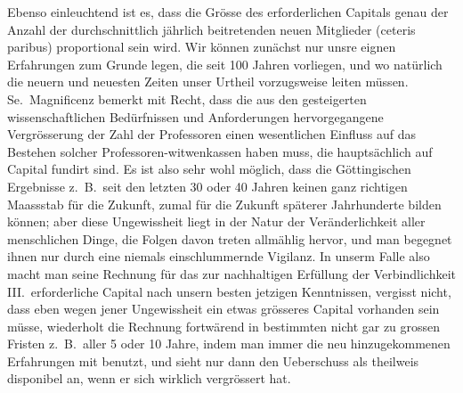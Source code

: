 \documentclass[12pt,a4paper]{article}
\begin{document}
Ebenso einleuchtend ist es, dass die Gr\"osse des erforderlichen Capitals genau der Anzahl der durchschnittlich j\"ahrlich beitretenden neuen Mitglieder (ceteris paribus) proportional sein wird. Wir k\"onnen zun\"achst nur unsre eignen Erfahrungen zum Grunde legen, die seit 100 Jahren vorliegen, und wo nat\"urlich die neuern und neuesten Zeiten unser Urtheil vorzugsweise leiten m\"ussen. Se.\ Magnificenz bemerkt mit Recht, dass die aus den gesteigerten wissenschaftlichen Bed\"urfnissen und Anforderungen hervorgegangene Vergr\"osserung der Zahl der Professoren einen wesentlichen Einfluss auf das Bestehen solcher Professoren-witwenkassen haben muss, die haupts\"achlich auf Capital fundirt sind. Es ist also sehr wohl m\"oglich, dass die G\"ottingischen Ergebnisse z.\ B.\ seit den letzten 30 oder 40 Jahren keinen ganz richtigen Maassstab f\"ur die Zukunft, zumal f\"ur die Zukunft sp\"aterer Jahrhunderte bilden k\"onnen; aber diese Ungewissheit liegt in der Natur der Ver\"anderlichkeit aller menschlichen Dinge, die Folgen davon treten allm\"ahlig hervor, und man begegnet ihnen nur durch eine niemals einschlummernde Vigilanz. In unserm Falle also macht man seine Rechnung f\"ur das zur nachhaltigen Erf\"ullung der Verbindlichkeit III.\ erforderliche Capital nach unsern besten jetzigen Kenntnissen, vergisst nicht, dass eben wegen jener Ungewissheit ein etwas gr\"osseres Capital vorhanden sein m\"usse, wiederholt die Rechnung fortw\"arend in bestimmten nicht gar zu grossen Fristen z.\ B.\ aller 5 oder 10 Jahre, indem man immer die neu hinzugekommenen Erfahrungen mit benutzt, und sieht nur dann den Ueberschuss als theilweis disponibel an, wenn er sich wirklich vergr\"ossert hat.
\end{document}
